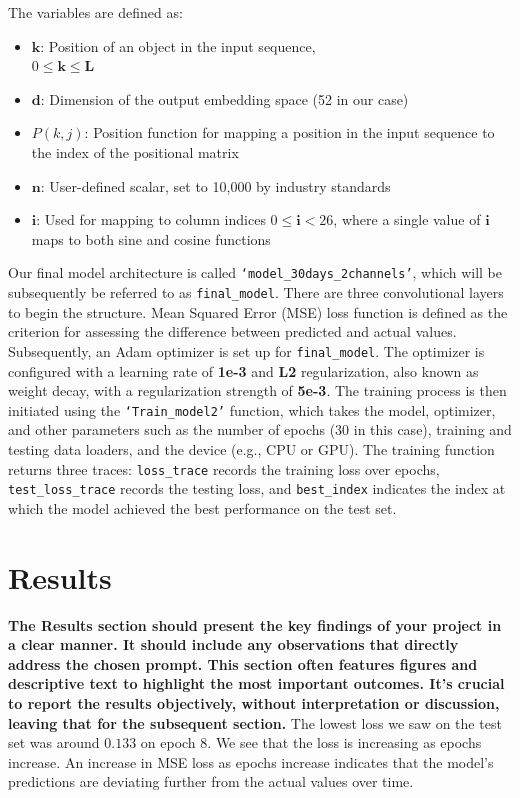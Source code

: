 \documentclass[10pt,twocolumn,letterpaper]{article}
\begin{document}
The variables are defined as:
\begin{itemize}
  \item \(\boldsymbol{k}\): Position of an object in the input sequence,\\ \(0 \leq \boldsymbol{k} \leq \boldsymbol{L}\)
  \item \(\boldsymbol{d}\): Dimension of the output embedding space (52 in our case)
  \item \(P(k, j)\): Position function for mapping a position in the input sequence to the index of the positional matrix
  \item \(\boldsymbol{n}\): User-defined scalar, set to 10,000 by industry standards ~\cite{Vaswani}
  \item \(\boldsymbol{i}\): Used for mapping to column indices \(0 \leq \boldsymbol{i} < 26\), where a single value of \(\boldsymbol{i}\) maps to both sine and cosine functions
\end{itemize}

Our final model architecture is called \texttt{`model\_30days\_2channels'}, which will be subsequently be referred to as \texttt{final\_model}. There are three convolutional layers to begin the structure.
Mean Squared Error (MSE) loss function is defined as the criterion for assessing the difference between predicted and actual values. Subsequently, an Adam optimizer is set up for \texttt{final\_model}. The optimizer is configured with a learning rate of \textbf{1e-3} and \textbf{L2} regularization, also known as weight decay, with a regularization strength of \textbf{5e-3}. The training process is then initiated using the \texttt{`Train\_model2'} function, which takes the model, optimizer, and other parameters such as the number of epochs (30 in this case), training and testing data loaders, and the device (e.g., CPU or GPU). The training function returns three traces: \texttt{loss\_trace} records the training loss over epochs, \texttt{test\_loss\_trace} records the testing loss, and \texttt{best\_index} indicates the index at which the model achieved the best performance on the test set.

\section{Results}
\textbf{The Results section should present the key findings of your project in a clear manner. It should include any observations that directly address the chosen prompt. This section often features figures and descriptive text to highlight the most important outcomes. It's crucial to report the results objectively, without interpretation or discussion, leaving that for the subsequent section.}
The lowest loss we saw on the test set was around $0.133$ on epoch $8$. We see that the loss is increasing as epochs increase. An increase in MSE loss as epochs increase indicates that the model's predictions are deviating further from the actual values over time. 
\end{document}
